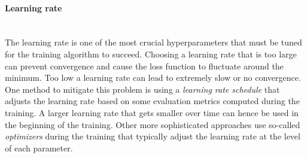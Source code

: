 

\paragraph{Learning rate} \mbox{}\\
The learning rate is one of the most crucial hyperparameters that must be tuned for the training algorithm to succeed. Choosing a learning rate that is too large can prevent convergence and cause the loss function to fluctuate around the minimum. Too low a learning rate can lead to extremely slow or no convergence. 
One method to mitigate this problem is using a \emph{learning rate schedule} that adjusts the learning rate based on some evaluation metrics computed during the training. A larger learning rate that gets smaller over time can hence be used in the beginning of the training. 
Other more sophisticated approaches use so-called \emph{optimizers} during the training that typically adjust the learning rate at the level of each parameter.


